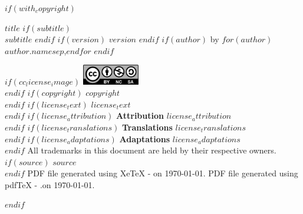 \documentclass[
    $if(fontsize)$$fontsize$$else$10pt$endif$,
    $if(papersize)$$papersize$$else$letterpaper$endif$,
    titlepage,
    oneside,
    openright,
    $if(is_draft)$draft$else$final$endif$,
    article]{memoir}
\begin{document}
\frontmatter

%
%
$if(with_copyright)$
    \thispagestyle{empty}
    \begin{flushleft}
        {\bfseries $title$}
        $if(subtitle)$
            {\\\itshape $subtitle$}
        $endif$
        $if(version)$
            \normalsize {}\space $version$
        $endif$
        \hfill\newline
        $if(author)$
            \normalsize by
            $for(author)$\normalsize $author.name$$sep$,\space$endfor$
        $endif$
        \vspace*{1em}

        \vspace*{1.5em}
        $if(cc_license_image)$
            \includegraphics[keepaspectratio=true, width=2.5cm]
                {cc_by_nc_sa_40.eps}\\[1.2em]
        $endif$
        \justify
        $if(copyright)$
            \normalsize $copyright$\\[1.2em]
        $endif$
        $if(license_text)$
            \normalsize $license_text$\\[1.2em]
        $endif$
        $if(license_attribution)$
            \normalsize {\bfseries Attribution}\textemdash%
                 $license_attribution$\\[1.2em]
        $endif$
        $if(license_translations)$
            \normalsize {\bfseries Translations}\textemdash%
                $license_translations$\\[1.2em]
        $endif$
        $if(license_adaptations)$
            \normalsize {\bfseries Adaptations}\textemdash%
                $license_adaptations$\\[1.2em]
        $endif$
        \normalsize All trademarks in this document are held by their %
            respective owners.\\[1.2em]
        $if(source)$
            \normalsize $source$\\[1.2em]
        $endif$
        \ifxetex
            \normalsize PDF file generated using XeTeX %
                \the\eTeXversion\eTeXrevision-%
                \the\XeTeXversion\XeTeXrevision\space on \today.
        \else
            \normalsize PDF file generated using pdfTeX %
                \the\eTeXversion\eTeXrevision-%
                \the\pdftexversion.\pdftexrevision\space on \today.
        \fi
    \end{flushleft}
    \pagebreak
    \cleardoublepage
$endif$
\end{document}
